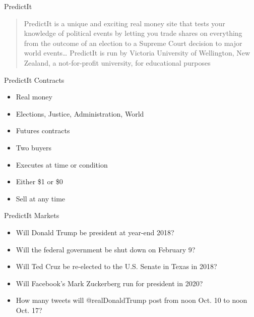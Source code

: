 \documentclass[ignorenonframetext,]{beamer}
\providecommand{\tightlist}{%
  \setlength{\itemsep}{0pt}\setlength{\parskip}{0pt}}
\begin{document}
\begin{frame}{PredictIt}

\begin{quote}
PredictIt is a unique and exciting real money site that tests your
knowledge of political events by letting you trade shares on everything
from the outcome of an election to a Supreme Court decision to major
world events\ldots{} PredictIt is run by Victoria University of
Wellington, New Zealand, a not-for-profit university, for educational
purposes
\end{quote}

\end{frame}

\begin{frame}{PredictIt Contracts}

\begin{itemize}
\tightlist
\item
  Real money
\item
  Elections, Justice, Administration, World
\item
  Futures contracts
\item
  Two buyers
\item
  Executes at time or condition
\item
  Either \$1 or \$0
\item
  Sell at any time
\end{itemize}

\end{frame}

\begin{frame}{PredictIt Markets}

\begin{itemize}
\tightlist
\item
  Will Donald Trump be president at year-end 2018?
\item
  Will the federal government be shut down on February 9?
\item
  Will Ted Cruz be re-elected to the U.S. Senate in Texas in 2018?
\item
  Will Facebook's Mark Zuckerberg run for president in 2020?
\item
  How many tweets will @realDonaldTrump post from noon Oct. 10 to noon
  Oct. 17?
\end{itemize}

\end{frame}
\end{document}
